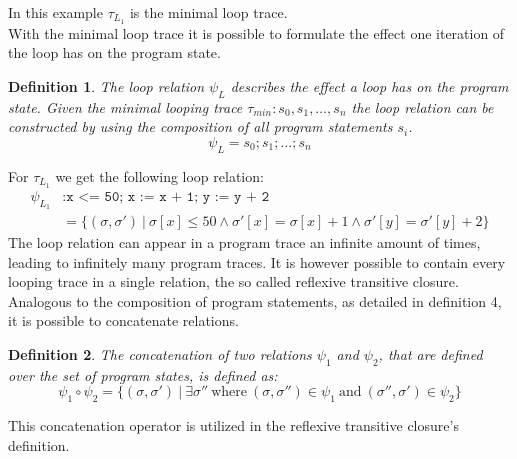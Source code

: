 \documentclass{article}
\newcounter{example}[section]
\newtheorem{mydef}{Definition}
\begin{document}
In this example $\tau_{L_1}$ is the minimal loop trace. \\

With the minimal loop trace it is possible to formulate the effect one iteration of the loop has on the program state.
\begin{mydef}
    The loop relation $\psi_L$ describes the effect a loop has on the program state.
    Given the minimal looping trace $\tau_{min}: s_0, s_1, \ldots, s_{n}$ the loop relation can be constructed by using the composition of all program statements $s_i$.
    \begin{equation*}
        \psi_L = s_0; s_1; \ldots; s_n
    \end{equation*}

\end{mydef}
For $\tau_{L_1}$ we get the following loop relation:
\begin{align*}
     \psi_{L_1}&:	\texttt{x <= 50; x := x + 1; y := y + 2} \ \\
     &= \{(\sigma, \sigma')\ |\ \sigma[x] \leq 50 \land \sigma'[x] = \sigma[x] + 1 \land \sigma'[y] = \sigma'[y] + 2 \}
\end{align*}
The loop relation can appear in a program trace an infinite amount of times, leading to infinitely many program traces. It is however possible to contain every looping trace in a single relation, the so called reflexive transitive closure. \\

Analogous to the composition of program statements, as detailed in definition 4, it is possible to concatenate relations.
\begin{mydef}
    The concatenation of two relations $\psi_1$ and $\psi_2$, that are defined over the set of program states, is defined as:
    \begin{equation*}
        \psi_1 \circ \psi_2 = \{(\sigma, \sigma')\ |\ \exists \sigma''\ \text{where}\ (\sigma, \sigma'') \in \psi_1\ \text{and}\ (\sigma'', \sigma') \in \psi_2 \}
    \end{equation*}
\end{mydef}

This concatenation operator is utilized in the reflexive transitive closure's definition.
\end{document}
